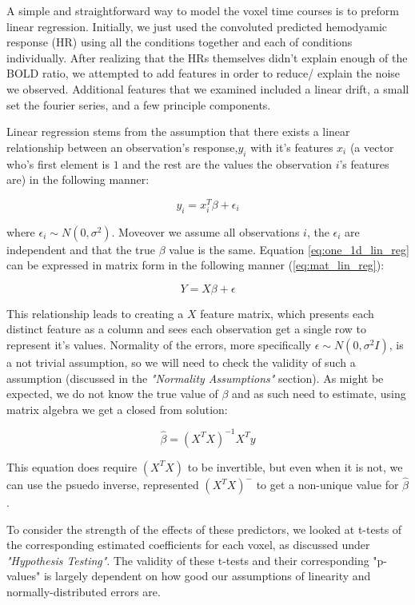 
\par \indent A simple and straightforward way to model the voxel time courses
is to preform linear regression. Initially, we just used the convoluted predicted
hemodyamic response (HR) using all the conditions together and each of 
conditions individually. After realizing that the HRs themselves didn't explain
enough of the BOLD ratio, we attempted to add features in order to reduce/ explain
the noise we observed. Additional features that we examined included a 
linear drift, a small set the fourier series, and a few principle components.

Linear regression stems from the assumption that there exists a linear relationship 
between an observation's response,$y_i$ with it's features $x_i$ (a vector who's 
first element is $1$ and the rest are the values the observation $i$'s features are) 
in the following manner:

\begin{equation}
y_i = x_i^T \beta + \epsilon_i
\label{eq:one_1d_lin_reg}
\end{equation}

where $\epsilon_i \sim N(0, \sigma^2)$. Moveover we assume all observations $i$, the $\epsilon_i$ are independent and that the true $\beta$ value is the same. Equation \ref{eq:one_1d_lin_reg} can be expressed in matrix form in the following manner (\ref{eq:mat_lin_reg}):

\begin{equation}
Y = X\beta + \epsilon
\label{eq:mat_lin_reg}
\end{equation}

This relationship leads to creating a $X$ feature matrix, which presents each distinct feature
as a column and sees each observation get a single row to represent it's values.
Normality of the errors, more specifically 
$\epsilon \sim N(0,\sigma^2 I)$, is a not trivial assumption, so we will need to check 
the validity of such a assumption (discussed in the \textit{"Normality Assumptions"} 
section). As might be expected, we do not know the true value of $\beta$ and as such
need to estimate, using matrix algebra we get a closed from solution:

\begin{equation}
\hat{\beta} =(X^T X)^{-1} X^T y
\end{equation}

This equation does require $(X^T X)$ to be invertible, but even when it is not, we
can use the psuedo inverse, represented  $(X^T X)^{-}$ to get a non-unique value
for $\hat{\beta}$.
\par To consider the strength of the effects of these predictors, we looked 
at t-tests of the corresponding estimated coefficients for each voxel, as 
discussed under \textit{"Hypothesis Testing"}. The validity of these t-tests and 
their corresponding "p-values" is largely dependent on how good our assumptions 
of linearity and normally-distributed errors are. 

